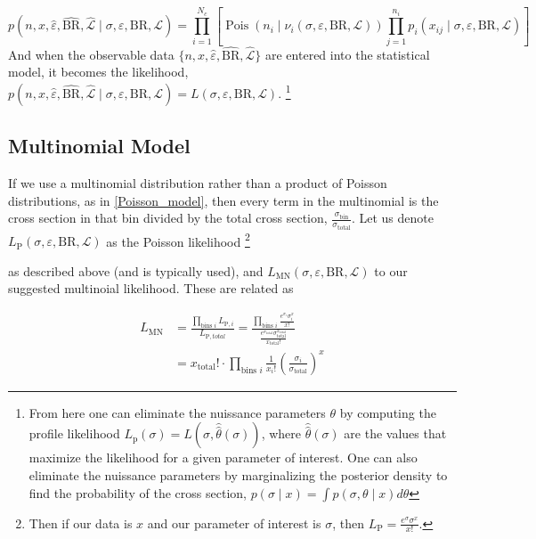 \begin{equation}
    p(n, x, \hat{\varepsilon}, \hat{\text{BR}}, \hat{\mathcal{L}} \mid \sigma, \varepsilon, \text{BR}, \mathcal{L})=\prod_{i=1}^{N_{c}}\left[\operatorname{Pois}\left(n_{i} \mid \nu_{i}(\sigma, \varepsilon, \text{BR}, \mathcal{L})\right) \prod_{j=1}^{n_{i}} p_{i}\left(x_{i j} \mid \sigma, \varepsilon, \text{BR}, \mathcal{L}\right)\right]
    \label{Poisson_model}
\end{equation}
And when the observable data $\{ n, x, \hat{\varepsilon}, \hat{\text{BR}}, \hat{\mathcal{L}} \} $ are entered into the statistical model, it becomes the likelihood, $p(n, x, \hat{\varepsilon}, \hat{\text{BR}}, \hat{\mathcal{L}} \mid \sigma, \varepsilon, \text{BR}, \mathcal{L}) = L(\sigma, \varepsilon, \text{BR}, \mathcal{L} )$.
\footnote{From here one can eliminate the nuissance parameters $\theta$ by computing the profile likelihood $L_{\mathrm{p}}(\sigma)=L(\sigma, \hat{\hat{\theta}}(\sigma))$, where $\hat{\hat{\theta}}(\sigma)$ are the values that maximize the likelihood for a given parameter of interest. One can also eliminate the nuissance parameters by marginalizing the posterior density to find the probability of the cross section, $p(\sigma \mid x)=\int p(\sigma, \theta \mid x) d \theta$ }

\subsection{Multinomial Model}
If we use a multinomial distribution rather than a product of Poisson distributions, as in \ref{Poisson_model}, then every term in the multinomial is the cross section in that bin divided by the total cross section, $\frac{\sigma_{\text{bin}}}{\sigma_{\text{total}}}$. Let us denote $L_{\text{P}}(\sigma, \varepsilon, \text{BR}, \mathcal{L} )$ as the Poisson likelihood
\footnote{Then if our data is $x$ and our parameter of interest is $\sigma$, then $L_{\text{P}} = \frac{e^{\sigma} \sigma^x}{x !}$.
}

as described above (and is typically used), and $L_{\text{MN}}(\sigma, \varepsilon, \text{BR}, \mathcal{L} )$ to our suggested multinoial likelihood. These are related as

\begin{equation}
\begin{aligned}
    L_\text{MN}  &= \frac{\prod_{\text{bins } i} L_{\text{P}, i}}{L_{\text{P}, total}}
    = \frac{\prod_{\text{bins } i} \frac{e^{\sigma_i} \sigma_i^x}{x !}}{\frac{e^{\sigma_{\text{total}}} \sigma_{\text{total}}^{x_\text{total}}}{x_\text{total} !}}\\
    &= x_\text{total} ! \cdot \prod_{\text {bins } i} \frac{1}{x_{i} !}\left(\frac{\sigma_{i}}{\sigma_{\text{total}}}\right)^{x}
\end{aligned}
\end{equation}

